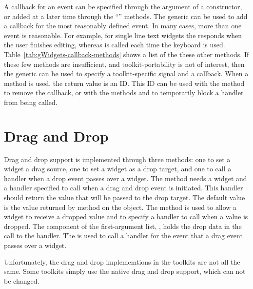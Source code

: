 A callback for an event can be specified through the 
argument of a constructor, or added at a later time through the
``'' methods. The generic  can
be used to add a callback for the most reasonably defined event. In
many cases, more than one event is reasonable. For example, for single
line text widgets the  responds when the user
finishes editing, whereas  is called each
time the keyboard is used.  Table~\ref{tab:gWidgets-callback-methods}
shows a list of the these other methods.  If these few methods are
insufficient, and toolkit-portability is not of interest, then the
 generic can be used to specify a toolkit-specific
signal and a callback.  When a  method is used,
the return value is an ID. This ID can be used with the method
 to remove the callback, or with the methods
 and  to temporarily block a
handler from being called.


\section{Drag and Drop}
\label{sec:drag-drop}

Drag and drop support is implemented through three methods: one to set a widget a drag source, one to set a widget as a drop target, and one to call a handler when a drop event passes over a widget. The  method needs a widget and a handler specified to call when a drag and drop event is initiated. This handler should return the value that will be passed to the drop target. The default value is the value returned by  method on the object. The  method is used to allow a widget to receive a dropped value and to specify a handler to call when a value is dropped. The  component of the first-argument list, , holds the drop data in the call to the handler. The  is used to call a handler for the event that a drag event passes over a widget.

Unfortunately, the drag and drop implememtions in the toolkits are not all the same. Some toolkits simply use the native drag and drop support, which can not be changed.

